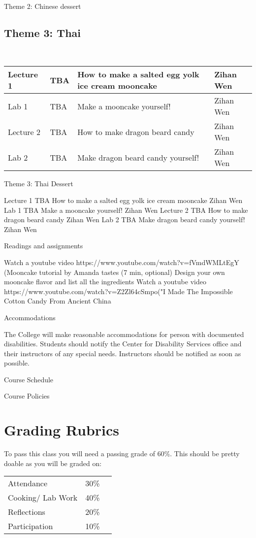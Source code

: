 \documentclass{article}
\begin{document}
Theme 2: Chinese dessert
 \subsection*{Theme 3: Thai }\\
 \vspace{0.5em} \begin{tabular}{|l|l|l|l|}
\hline 
Lecture 1 & TBA & How to make a salted egg yolk ice cream mooncake & Zihan Wen\\
\hline
Lab 1 & TBA & Make a mooncake yourself!& Zihan Wen\\
\hline
Lecture 2 & TBA & How to make dragon beard candy & Zihan Wen\\
\hline 
Lab 2 & TBA & Make dragon beard candy yourself!& Zihan Wen\\
\hline
\end{tabular}
Theme 3: Thai Dessert

Lecture 1
TBA
How to make a salted egg yolk ice cream mooncake 
Zihan Wen
Lab 1 
TBA
Make a mooncake yourself!
Zihan Wen
Lecture 2 
TBA
How to make dragon beard candy
Zihan Wen
Lab 2 
TBA
Make dragon beard candy yourself!
Zihan Wen

Readings and assignments

Watch a youtube video https://www.youtube.com/watch?v=fVmdWMLtEgY (Mooncake tutorial by Amanda tastes (7 min, optional)
Design your own mooncake flavor and list all the ingredients 
Watch a youtube video https://www.youtube.com/watch?v=Z2Zl64cSmpo("I Made The Impossible Cotton Candy From Ancient China 

Accommodations 

The College will make reasonable accommodations for person with documented disabilities. Students should notify the Center for Disability Services office and their instructors of any special needs. Instructors should be notified as soon as possible.

Course Schedule

Course Policies

\section{Grading Rubrics} 


To pass this class you will need a passing grade of 60\%. This should be pretty doable as you will be graded on:

\begin{table}[h]
\begin{tabular}{lll}
 Attendance &  30\% \\
 Cooking/ Lab Work & 40\%  \\
 Reflections &  20\%  \\
 Participation & 10\% \\ 
\end{tabular}
\end{table}   
\end{document}
